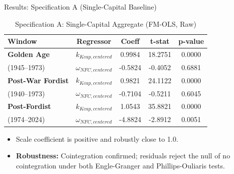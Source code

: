 \documentclass[10pt]{beamer}
\begin{document}
\begin{frame}{Results: Specification A (Single-Capital Baseline)}
  \begin{table}[htbp]
    \centering
    \caption{Specification A: Single-Capital Aggregate (FM-OLS, Raw)}
    \footnotesize
    \begin{tabular}{lcccc}
      \toprule
      \textbf{Window} & \textbf{Regressor} & \textbf{Coeff} & \textbf{t-stat} & \textbf{p-value} \\
      \midrule
      \textbf{Golden Age} & $k_{Kcap, centered}$ & 0.9984 & 18.2751 & 0.0000 \\
      (1945--1973) & $\omega_{NFC, centered}$ & -0.5824 & -0.4052 & 0.6881 \\
      \midrule
      \textbf{Post-War Fordist} & $k_{Kcap, centered}$ & 0.9821 & 24.1122 & 0.0000 \\
      (1940--1973) & $\omega_{NFC, centered}$ & -0.7104 & -0.5211 & 0.6045 \\
      \midrule
      \textbf{Post-Fordist} & $k_{Kcap, centered}$ & 1.0543 & 35.8821 & 0.0000 \\
      (1974--2024) & $\omega_{NFC, centered}$ & -4.8824 & -2.8912 & 0.0051 \\
      \bottomrule
    \end{tabular}
  \end{table}
  \begin{itemize}
    \item Scale coefficient is positive and robustly close to 1.0.
    \item \textbf{Robustness:} Cointegration confirmed; residuals reject the null of no cointegration under both Engle-Granger and Phillips-Ouliaris tests.
  \end{itemize}
\end{frame}
\end{document}
